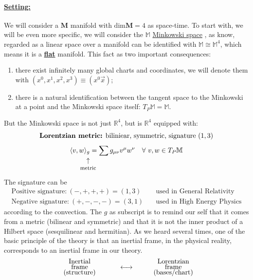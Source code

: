 \documentclass[../main.tex]{subfiles}
\begin{document}
\paragraph{\underline{Setting:}} We will consider a $\mathbf{M}$ manifold with {\color{red}$\textrm{dim}\mathbf{M}=4$} as space-time. To start with, we will be even more specific, we will consider the $\mathbb{M}$ \href{https://it.wikipedia.org/wiki/Spaziotempo_di_Minkowski}{Minkowski space}
, as know, regarded as a linear space over a manifold can be identified with $\mathbb{M}\cong\mathbb{M}^4$, which means it is a \underline{\textbf{flat}} manifold. This fact as two important consequences:
\begin{enumerate}
    \item there exist infinitely many global charts and coordinates, we will denote them with $\left(x^0,x^1,x^2,x^3\right)\equiv \left(x^0\vec{x}\right)$;
    \item there is a natural identification between the tangent space to the Minkowski at a point and the Minkowski space itself: $T_P\mathbb{M}=\mathbb{M}$.
\end{enumerate}
But the Minkowski space is not just $\mathbb{R}^4$, but is $\mathbb{R}^4$ equipped with:
\[
\textrm{\textbf{Lorentzian metric:} biliniear, symmetric, signature} \ (1,3)
\]
\[
\langle v,w\rangle_{\underset{\mathclap{\tikz \node {$\uparrow$} node [below=1ex] {\footnotesize metric};}}{g}}=\sum g_{\mu\nu}v^\mu w^\nu \quad \forall \ v,w \in T_P\mathbb{M}
\]
The signature can be
\[
\begin{split}
    \textrm{Positive signature:} \ (-,+,+,+)=(1,3) \quad & \textrm{used in General Relativity}\\
    \textrm{Negative signature:} \ (+,-,-,-)=(3,1) \quad & \textrm{used in High Energy Physics}
\end{split}
\]
according to the convection. The $g$ as subscript is to remind our self that it comes from a metric (bilinear and symmetric) and that it is not the inner product of a Hilbert space (sesquilinear and hermitian). As we heard several times, one of the basic principle of the theory is that an inertial frame, in the physical reality, corresponds to an inertial frame in our theory.
\[
\text{\parbox{4 cm}{\centering Inertial \\[-4pt] frame \\[-4pt] (structure)}}\longleftrightarrow\text{\parbox{4 cm}{\centering Lorentzian \\[-4pt] frame  \\[-4pt] (bases/chart)}}
\]
\end{document}
